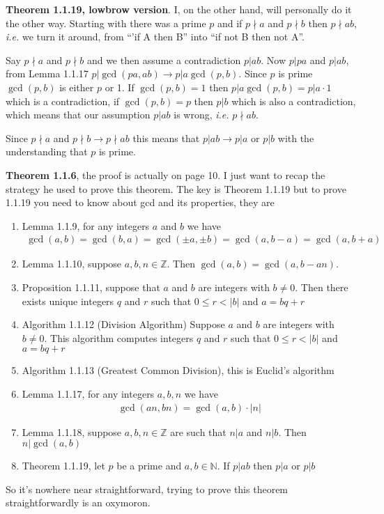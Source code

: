 \documentclass[aps,preprint,preprintnumbers,nofootinbib,showpacs,prd]{revtex4-1}
\newcommand{\ie}{{\it i.e.} }
\newcommand{\nbea}{\begin{eqnarray*}}
\newcommand{\neea}{\end{eqnarray*}}
\begin{document}
{\bf Theorem 1.1.19, lowbrow version}. I, on the other hand, will personally do it the other way. Starting with there was a prime $p$ and if $p \nmid a$ and $p \nmid b$ then $p \nmid ab$, \ie we turn it around, from ``'if A then B'' into ``if not B then not A''.

Say $p \nmid a$ and $p \nmid b$ and we then assume a contradiction $p | ab$. Now $p | pa$ and $p | ab$, from Lemma 1.1.17 $p | \gcd(pa,ab) \to p | a \gcd (p,b)$. Since $p$ is prime $\gcd(p,b)$ is either $p$ or 1. If $\gcd(p,b) = 1$ then $p | a \gcd (p,b) = p|a \cdot 1$ which is a contradiction, if $\gcd(p,b) = p$ then $p|b$ which is also a contradiction, which means that our assumption $p|ab$ is wrong, \ie $p \nmid ab$.

Since $p \nmid a$ and $p \nmid b \longrightarrow p \nmid ab$ this means that $p|ab \longrightarrow p|a$ or $p|b$ with the understanding that $p$ is prime.


{\bf Theorem 1.1.6}, the proof is actually on page 10. I just want to recap the strategy he used to prove this theorem. The key is Theorem 1.1.19 but to prove 1.1.19 you need to know about gcd and its properties, they are
\begin{enumerate}
\item Lemma 1.1.9, for any integers $a$ and $b$ we have
%
\nbea
\gcd(a,b) = \gcd(b,a) = \gcd(\pm a,\pm b) = \gcd(a,b-a) = \gcd(a,b+a)
\neea
%
\item Lemma 1.1.10, suppose $a,b,n \in \mathbb{Z}$. Then $\gcd(a,b) = \gcd(a,b-an)$.
\item Proposition 1.1.11, suppose that $a$ and $b$ are integers with $b \neq 0$. Then there exists unique integers $q$ and $r$ such that $0 \le r < |b|$ and $a = bq + r$
\item Algorithm 1.1.12 (Division Algorithm) Suppose $a$ and $b$ are integers with $b \neq 0$. This algorithm computes integers $q$ and $r$ such that $0 \le r < |b|$ and $a = bq + r$
\item Algorithm 1.1.13 (Greatest Common Division), this is Euclid's algorithm
\item Lemma 1.1.17, for any integers $a,b,n$ we have
%
\nbea
\gcd(an,bn) = \gcd(a,b) \cdot |n|
\neea
%
\item Lemma 1.1.18, suppose $a,b,n \in \mathbb{Z}$ are such that $n|a$ and $n|b$. Then $n|\gcd(a,b)$
\item Theorem 1.1.19, let $p$ be a prime and $a,b \in \mathbb{N}$. If $p|ab$ then $p|a$ or $p|b$
\end{enumerate}
So it's nowhere near straightforward, trying to prove this theorem straightforwardly is an oxymoron.
\end{document}
